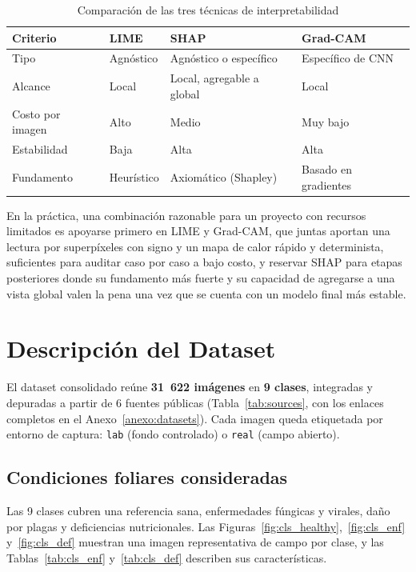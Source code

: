 \documentclass[12pt,letterpaper]{article}
\begin{document}
\begin{table}[H]
\caption{Comparaci\'on de las tres t\'ecnicas de interpretabilidad}
\label{tab:xai}
\centering
\small
\begin{singlespace}
\begin{tabular}{p{2.6cm}p{3.0cm}p{3.0cm}p{3.0cm}}
\toprule
\textbf{Criterio} & \textbf{LIME} & \textbf{SHAP} & \textbf{Grad-CAM} \\
\midrule
Tipo & Agn\'ostico & Agn\'ostico o espec\'ifico & Espec\'ifico de CNN \\
Alcance & Local & Local, agregable a global & Local \\
Costo por imagen & Alto & Medio & Muy bajo \\
Estabilidad & Baja & Alta & Alta \\
Fundamento & Heur\'istico & Axiom\'atico (Shapley) & Basado en gradientes \\
\bottomrule
\end{tabular}
\end{singlespace}
\end{table}

En la pr\'actica, una combinaci\'on razonable para un proyecto con recursos limitados es apoyarse primero en LIME y Grad-CAM, que juntas aportan una lectura por superp\'ixeles con signo y un mapa de calor r\'apido y determinista, suficientes para auditar caso por caso a bajo costo, y reservar SHAP para etapas posteriores donde su fundamento m\'as fuerte y su capacidad de agregarse a una vista global valen la pena una vez que se cuenta con un modelo final m\'as estable.

\section{Descripci\'on del Dataset}

El dataset consolidado re\'une \textbf{31~622 im\'agenes} en \textbf{9 clases}, integradas y depuradas a partir de 6 fuentes p\'ublicas (Tabla~\ref{tab:sources}, con los enlaces completos en el Anexo~\ref{anexo:datasets}). Cada imagen queda etiquetada por entorno de captura: \texttt{lab} (fondo controlado) o \texttt{real} (campo abierto).

\subsection{Condiciones foliares consideradas}

Las 9 clases cubren una referencia sana, enfermedades f\'ungicas y virales, da\~no por plagas y deficiencias nutricionales. Las Figuras~\ref{fig:cls_healthy},~\ref{fig:cls_enf} y~\ref{fig:cls_def} muestran una imagen representativa de campo por clase, y las Tablas~\ref{tab:cls_enf} y~\ref{tab:cls_def} describen sus caracter\'isticas.
\end{document}
